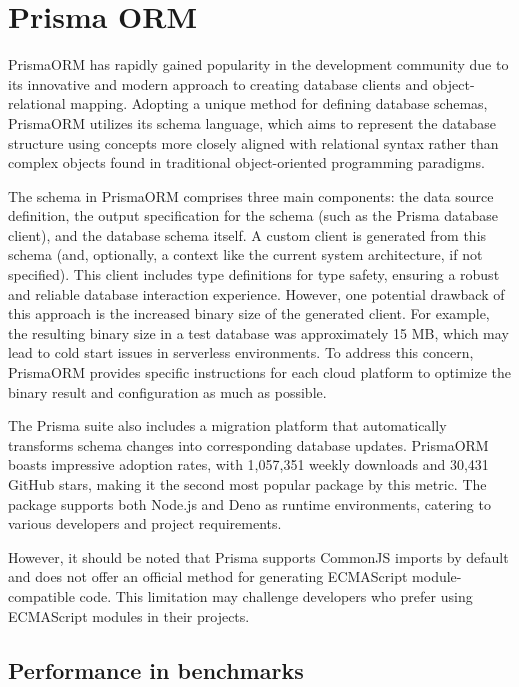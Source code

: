 \section{Prisma ORM}

PrismaORM has rapidly gained popularity in the development community due to its
innovative and modern approach to creating database clients and
object-relational mapping. Adopting a unique method for defining database
schemas, PrismaORM utilizes its schema language, which aims to represent the
database structure using concepts more closely aligned with relational syntax
rather than complex objects found in traditional object-oriented programming
paradigms.

The schema in PrismaORM comprises three main components: the data source
definition, the output specification for the schema (such as the Prisma database
client), and the database schema itself. A custom client is generated from this
schema (and, optionally, a context like the current system architecture, if not
specified). This client includes type definitions for type safety, ensuring a
robust and reliable database interaction experience. However, one potential
drawback of this approach is the increased binary size of the generated client.
For example, the resulting binary size in a test database was approximately 15
MB, which may lead to cold start issues in serverless environments. To address
this concern, PrismaORM provides specific instructions for each cloud platform
to optimize the binary result and configuration as much as possible.

The Prisma suite also includes a migration platform that automatically
transforms schema changes into corresponding database updates. PrismaORM boasts
impressive adoption rates, with 1,057,351 weekly downloads and 30,431 GitHub
stars, making it the second most popular package by this metric. The package
supports both Node.js and Deno as runtime environments, catering to various
developers and project requirements.

However, it should be noted that Prisma supports CommonJS imports by default and
does not offer an official method for generating ECMAScript module-compatible
code. This limitation may challenge developers who prefer using ECMAScript
modules in their projects.

\subsection{Performance in benchmarks}

